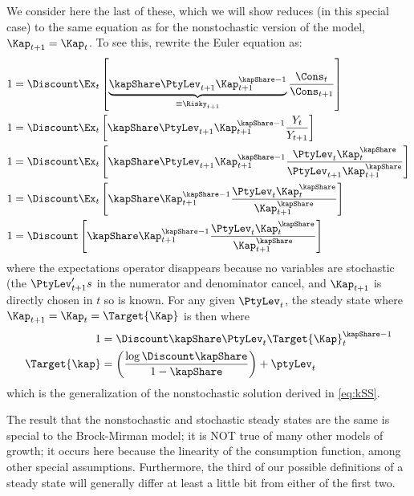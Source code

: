 We consider here the last of these, which we will show reduces (in this special case) to the same equation as for the nonstochastic version of the model, $\Kap_{t+1}=\Kap_{t}$.  To see this, rewrite the Euler equation as:
\begin{equation*}\begin{gathered}\begin{aligned}
  1 & =  \Discount \Ex_{t} \left[\underbrace{\kapShare \PtyLev_{t+1} \Kap_{t+1}^{\kapShare-1}}_{\equiv \Risky_{t+1}}\frac{\Cons_{t}}{\Cons_{t+1}}\right]
  \\   1 & =  \Discount \Ex_{t} \left[\kapShare \PtyLev_{t+1} \Kap_{t+1}^{\kapShare-1}\frac{Y_{t}}{Y_{t+1}}\right]
  \\   1 & =  \Discount \Ex_{t} \left[\kapShare \PtyLev_{t+1} \Kap_{t+1}^{\kapShare-1}\frac{\PtyLev_{t} \Kap_{t}^{\kapShare}}{\PtyLev_{t+1} \Kap_{t+1}^{\kapShare}}\right]
  \\   1 & =  \Discount \Ex_{t} \left[\kapShare \Kap_{t+1}^{\kapShare-1}\frac{\PtyLev_{t} \Kap_{t}^{\kapShare}}{\Kap_{t+1}^{\kapShare}}\right]
  \\   1 & =  \Discount \left[\kapShare \Kap_{t+1}^{\kapShare-1}\frac{\PtyLev_{t} \Kap_{t}^{\kapShare}}{\Kap_{t+1}^{\kapShare}}\right]
\end{aligned}\end{gathered}\end{equation*}
where the expectations operator disappears because no variables are stochastic (the $\PtyLev_{t+1}'s$ in the numerator and denominator cancel, and $\Kap_{t+1}$ is directly chosen in $t$ so is known.  For any given $\PtyLev_{t}$, the steady state where $\Kap_{t+1}=\Kap_{t}=\Target{\Kap}$ is then where
\begin{equation*}\begin{gathered}\begin{aligned}
  1 & =  \Discount \kapShare \PtyLev_{t} \Target{\Kap}_{t}^{\kapShare-1}
\\ \Target{\kap} & =  \left(\frac{ \log \Discount \kapShare }{1-\kapShare}\right)+\ptyLev_{t}
\end{aligned}\end{gathered}\end{equation*}
which is the generalization of the nonstochastic solution derived in \eqref{eq:kSS}.

The result that the nonstochastic and stochastic steady states are the same is special to the Brock-Mirman model; it is NOT true of many other models of growth; it occurs here because the linearity of the consumption function, among other special assumptions.  Furthermore, the third of our possible definitions of a steady state will generally differ at least a little bit from either of the first two.

\renewcommand\refname{\noindent{\href{http://www.econ2.jhu.edu/people/ccarroll/public/lecturenotes/DSGEModels/BrockMirman/BrockMirman.bib}{\large References {\small (click to download \texttt{.bib} file)}}}}



